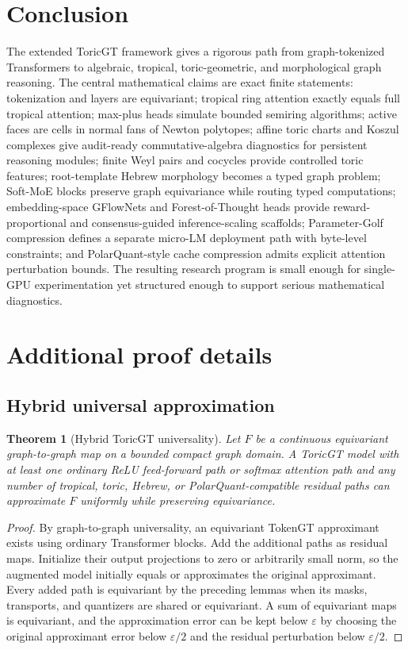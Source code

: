 \documentclass[11pt]{article}
\theoremstyle{definition}
\theoremstyle{plain}
\newtheorem{theorem}[definition]{Theorem}
\theoremstyle{remark}
\numberwithin{equation}{section}
\begin{document}
\section{Conclusion}

The extended ToricGT framework gives a rigorous path from graph-tokenized Transformers to algebraic, tropical, toric-geometric, and morphological graph reasoning.  The central mathematical claims are exact finite statements: tokenization and layers are equivariant; tropical ring attention exactly equals full tropical attention; max-plus heads simulate bounded semiring algorithms; active faces are cells in normal fans of Newton polytopes; affine toric charts and Koszul complexes give audit-ready commutative-algebra diagnostics for persistent reasoning modules; finite Weyl pairs and cocycles provide controlled toric features; root-template Hebrew morphology becomes a typed graph problem; Soft-MoE blocks preserve graph equivariance while routing typed computations; embedding-space GFlowNets and Forest-of-Thought heads provide reward-proportional and consensus-guided inference-scaling scaffolds; Parameter-Golf compression defines a separate micro-LM deployment path with byte-level constraints; and PolarQuant-style cache compression admits explicit attention perturbation bounds.  The resulting research program is small enough for single-GPU experimentation yet structured enough to support serious mathematical diagnostics.

\appendix

\section{Additional proof details}

\subsection{Hybrid universal approximation}

\begin{theorem}[Hybrid ToricGT universality]
Let $F$ be a continuous equivariant graph-to-graph map on a bounded compact graph domain.  A ToricGT model with at least one ordinary ReLU feed-forward path or softmax attention path and any number of tropical, toric, Hebrew, or PolarQuant-compatible residual paths can approximate $F$ uniformly while preserving equivariance.
\end{theorem}

\begin{proof}
By graph-to-graph universality, an equivariant TokenGT approximant exists using ordinary Transformer blocks.  Add the additional paths as residual maps.  Initialize their output projections to zero or arbitrarily small norm, so the augmented model initially equals or approximates the original approximant.  Every added path is equivariant by the preceding lemmas when its masks, transports, and quantizers are shared or equivariant.  A sum of equivariant maps is equivariant, and the approximation error can be kept below $\varepsilon$ by choosing the original approximant error below $\varepsilon/2$ and the residual perturbation below $\varepsilon/2$.
\end{proof}
\end{document}
